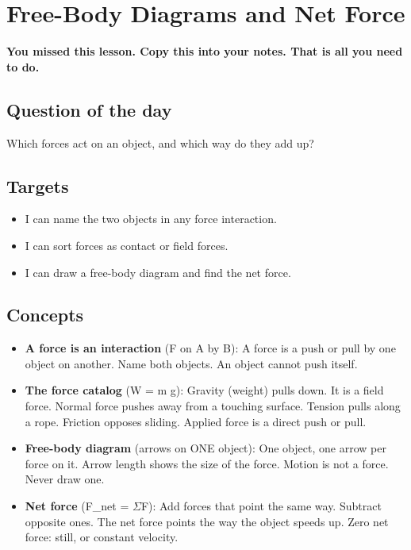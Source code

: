 \documentclass[11pt]{article}
\begin{document}
\section*{Free-Body Diagrams and Net Force}
\textbf{You missed this lesson. Copy this into your notes. That is all you need to do.}\par\medskip
\subsection*{Question of the day}
Which forces act on an object, and which way do they add up?\par
\subsection*{Targets}\begin{itemize}\item I can name the two objects in any force interaction.
\item I can sort forces as contact or field forces.
\item I can draw a free-body diagram and find the net force.\end{itemize}
\subsection*{Concepts}\begin{itemize}
\item \textbf{A force is an interaction} (F on A by B): A force is a push or pull by one object on another. Name both objects. An object cannot push itself.
\item \textbf{The force catalog} (W = m g): Gravity (weight) pulls down. It is a field force. Normal force pushes away from a touching surface. Tension pulls along a rope. Friction opposes sliding. Applied force is a direct push or pull.
\item \textbf{Free-body diagram} (arrows on ONE object): One object, one arrow per force on it. Arrow length shows the size of the force. Motion is not a force. Never draw one.
\item \textbf{Net force} (F\_net = $\Sigma$F): Add forces that point the same way. Subtract opposite ones. The net force points the way the object speeds up. Zero net force: still, or constant velocity.
\end{itemize}
\end{document}
